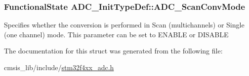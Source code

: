 \subsubsection[{\texorpdfstring{A\+D\+C\+\_\+\+Scan\+Conv\+Mode}{ADC_ScanConvMode}}]{\setlength{\rightskip}{0pt plus 5cm}Functional\+State A\+D\+C\+\_\+\+Init\+Type\+Def\+::\+A\+D\+C\+\_\+\+Scan\+Conv\+Mode}\hypertarget{struct_a_d_c___init_type_def_aaf44f54f22ab40bf8fae01f075aa4c87}{}\label{struct_a_d_c___init_type_def_aaf44f54f22ab40bf8fae01f075aa4c87}
Specifies whether the conversion is performed in Scan (multichannels) or Single (one channel) mode. This parameter can be set to E\+N\+A\+B\+LE or D\+I\+S\+A\+B\+LE 

The documentation for this struct was generated from the following file\+:\begin{DoxyCompactItemize}
\item 
cmsis\+\_\+lib/include/\hyperlink{stm32f4xx__adc_8h}{stm32f4xx\+\_\+adc.\+h}\end{DoxyCompactItemize}
